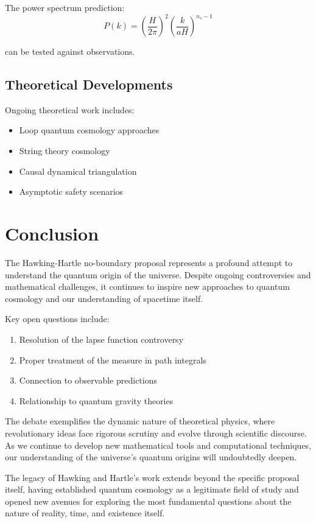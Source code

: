 \documentclass[12pt,a4paper]{article}
\begin{document}
The power spectrum prediction:
\begin{equation}
P(k) = \left(\frac{H}{2\pi}\right)^2 \left(\frac{k}{a H}\right)^{n_s - 1}
\end{equation}

can be tested against observations.

\subsection{Theoretical Developments}

Ongoing theoretical work includes:
\begin{itemize}
    \item Loop quantum cosmology approaches
    \item String theory cosmology
    \item Causal dynamical triangulation
    \item Asymptotic safety scenarios
\end{itemize}

\section{Conclusion}

The Hawking-Hartle no-boundary proposal represents a profound attempt to understand the quantum origin of the universe. Despite ongoing controversies and mathematical challenges, it continues to inspire new approaches to quantum cosmology and our understanding of spacetime itself.

Key open questions include:
\begin{enumerate}
    \item Resolution of the lapse function controversy
    \item Proper treatment of the measure in path integrals
    \item Connection to observable predictions
    \item Relationship to quantum gravity theories
\end{enumerate}

The debate exemplifies the dynamic nature of theoretical physics, where revolutionary ideas face rigorous scrutiny and evolve through scientific discourse. As we continue to develop new mathematical tools and computational techniques, our understanding of the universe's quantum origins will undoubtedly deepen.

The legacy of Hawking and Hartle's work extends beyond the specific proposal itself, having established quantum cosmology as a legitimate field of study and opened new avenues for exploring the most fundamental questions about the nature of reality, time, and existence itself.


\end{document}
